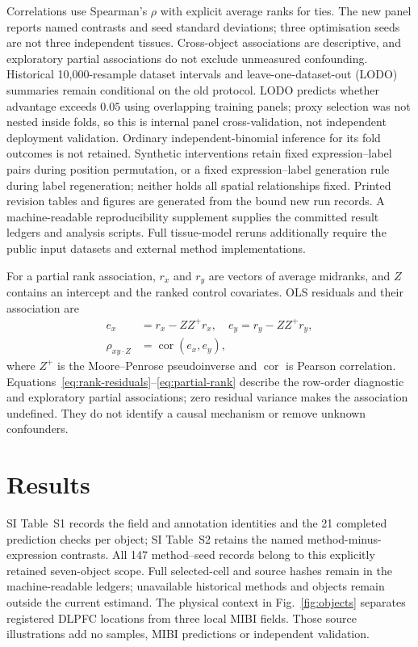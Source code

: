 \documentclass[journal]{IEEEtran}
\begin{document}
Correlations use Spearman's $\rho$ with explicit average ranks for ties. The new panel reports named contrasts and seed standard deviations; three optimisation seeds are not three independent tissues. Cross-object associations are descriptive, and exploratory partial associations do not exclude unmeasured confounding. Historical 10{,}000-resample dataset intervals and leave-one-dataset-out (LODO) summaries remain conditional on the old protocol. LODO predicts whether advantage exceeds $0.05$ using overlapping training panels; proxy selection was not nested inside folds, so this is internal panel cross-validation, not independent deployment validation. Ordinary independent-binomial inference for its fold outcomes is not retained. Synthetic interventions retain fixed expression--label pairs during position permutation, or a fixed expression--label generation rule during label regeneration; neither holds all spatial relationships fixed. Printed revision tables and figures are generated from the bound new run records. A machine-readable reproducibility
supplement supplies the committed result ledgers and analysis scripts. Full tissue-model reruns additionally require the public input datasets and external method implementations.

For a partial rank association, $r_x$ and $r_y$ are vectors of average
midranks, and $Z$ contains an intercept and the ranked control covariates.
OLS residuals and their association are
\begin{align}
e_x&=r_x-ZZ^+r_x,\quad e_y=r_y-ZZ^+r_y,\label{eq:rank-residuals}\\
\rho_{xy\cdot Z}&=\operatorname{cor}(e_x,e_y),\label{eq:partial-rank}
\end{align}
where $Z^+$ is the Moore--Penrose pseudoinverse and $\operatorname{cor}$
is Pearson correlation. Equations~\ref{eq:rank-residuals}--\ref{eq:partial-rank}
describe the row-order diagnostic and exploratory partial associations;
zero residual variance makes the association undefined. They do not
identify a causal mechanism or remove unknown confounders.

\section{Results}


SI Table~S1 records the field and annotation identities and the 21
completed prediction checks per object; SI Table~S2 retains the named
method-minus-expression contrasts. All 147 method--seed records belong to
this explicitly retained seven-object scope. Full selected-cell and source
hashes remain in the machine-readable ledgers; unavailable historical
methods and objects remain outside the current estimand. The physical
context in Fig.~\ref{fig:objects} separates registered DLPFC locations
from three local MIBI fields. Those source illustrations add no samples,
MIBI predictions or independent validation.
\end{document}
